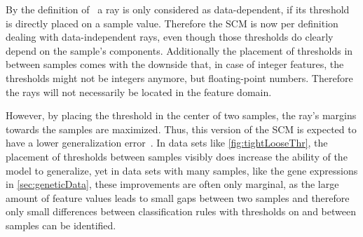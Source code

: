 By the definition of~\cite{kestler11} a ray is only considered as data-dependent, if its threshold is directly placed on a sample value.
Therefore the SCM is now per definition dealing with data-independent rays, even though those thresholds do clearly depend on the sample's components.
Additionally the placement of thresholds in between samples comes with the downside that, in case
of integer features, the thresholds might not be integers anymore, but floating-point numbers.
Therefore the rays will not necessarily be located in the feature domain.

However, by placing the threshold in the center of two samples, the ray's margins towards the samples are maximized.
Thus, this version of the SCM is expected to have a lower generalization error~\citep{shawe}.
In data sets like \autoref{fig:tightLooseThr}, the placement of thresholds between samples visibly
does increase the ability of the model to generalize, yet in data sets with many samples, like the gene expressions in \autoref{sec:geneticData},
these improvements are often only marginal, as the large amount of feature values leads to
small gaps between two samples and therefore only small differences between classification
rules with thresholds on and between samples can be identified.

